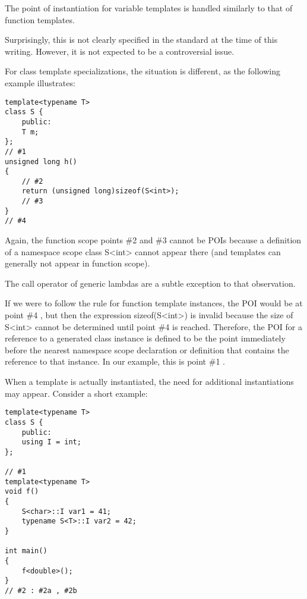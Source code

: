 The point of instantiation for variable templates is handled similarly to that of function templates.

\begin{tcolorbox}[colback=webgreen!5!white,colframe=webgreen!75!black]
\hspace*{0.75cm}Surprisingly, this is not clearly specified in the standard at the time of this writing. However, it is not expected to be a controversial issue.
\end{tcolorbox}

For class template specializations, the situation is different, as the following example illustrates:

\begin{lstlisting}[style=styleCXX]
template<typename T>
class S {
	public:
	T m;
};
// #1
unsigned long h()
{
	// #2
	return (unsigned long)sizeof(S<int>);
	// #3
}
// #4
\end{lstlisting}

Again, the function scope points \#2 and \#3 cannot be POIs because a definition of a namespace scope class S<int> cannot appear there (and templates can generally not appear in function scope).

\begin{tcolorbox}[colback=webgreen!5!white,colframe=webgreen!75!black]
\hspace*{0.75cm}The call operator of generic lambdas are a subtle exception to that observation.
\end{tcolorbox}

If we were to follow the rule for function template instances, the POI would be at point \#4 , but then the expression sizeof(S<int>) is invalid because the size of S<int> cannot be determined until point \#4 is reached. Therefore, the POI for a reference to a generated class instance is defined to be the point immediately before the nearest namespace scope declaration or definition that contains the reference to that instance. In our example, this is point \#1 .

When a template is actually instantiated, the need for additional instantiations may appear. Consider a short example:

\begin{lstlisting}[style=styleCXX]
template<typename T>
class S {
	public:
	using I = int;
};

// #1
template<typename T>
void f()
{
	S<char>::I var1 = 41;
	typename S<T>::I var2 = 42;
}

int main()
{
	f<double>();
}
// #2 : #2a , #2b
\end{lstlisting}

